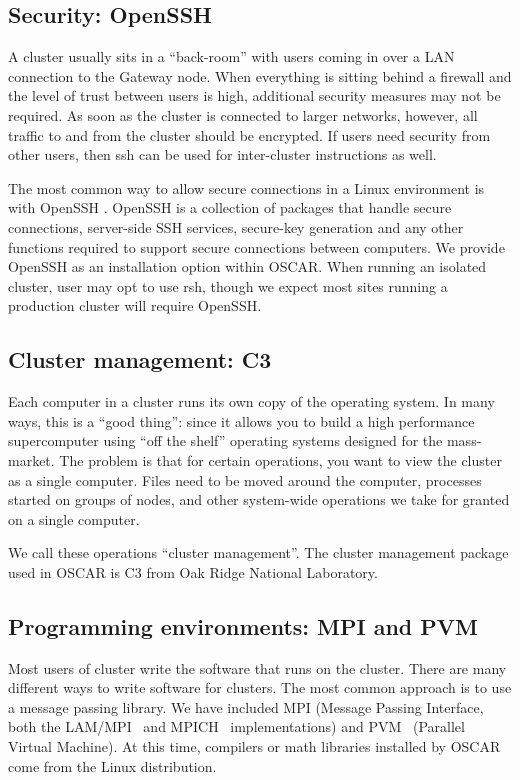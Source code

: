 \documentclass[letterpaper,11pt]{article}
\begin{document}
\subsection{Security: OpenSSH}
A cluster usually sits in a ``back-room'' with users coming in over a
LAN connection to the Gateway node.  When everything is sitting behind
a firewall and the level of trust between users is high, additional
security measures may not be required.  As soon as the cluster is
connected to larger networks, however, all traffic to and from the
cluster should be encrypted.  If users need security from other users,
then ssh can be used for inter-cluster instructions as well.

The most common way to allow secure connections in a Linux environment
is with OpenSSH \cite{OpenSSH}.  OpenSSH is a collection of packages
that handle secure connections, server-side SSH services, secure-key
generation and any other functions required to support secure
connections between computers.  We provide OpenSSH as an installation
option within OSCAR.  When running an isolated cluster, user may opt
to use rsh, though we expect most sites running a production cluster
will require OpenSSH.


\subsection{Cluster management: C3}
Each computer in a cluster runs its own copy of the operating system.
In many ways, this is a ``good thing'': since it allows you to build a
high performance supercomputer using ``off the shelf'' operating
systems designed for the mass-market.  The problem is that for certain
operations, you want to view the cluster as a single computer.  Files
need to be moved around the computer, processes started on groups of
nodes, and other system-wide  operations we take for granted on a
single computer.

We call these operations ``cluster management''.  The cluster
management package used in OSCAR is C3 \cite{C3} from Oak Ridge
National Laboratory.


\subsection{Programming environments: MPI and PVM}
Most users of cluster write the software that runs on the cluster.
There are many different ways to write software for clusters.  The
most common approach is to use a message passing library.  We have
included MPI (Message Passing Interface, both the LAM/MPI~\cite{lam}
and MPICH~\cite{mpich} implementations) and PVM~\cite{PVM} (Parallel
Virtual Machine).  At this time, compilers or math libraries installed
by OSCAR come from the Linux distribution.
\end{document}
